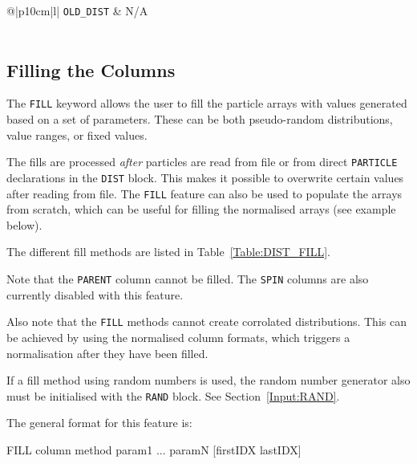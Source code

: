 \begin{center}
\begin{longtable}{@{\extracolsep{\fill}}|p{10cm}|l|}
    \rowcolor{gray!15}
    \texttt{OLD\_DIST} & N/A \\*
    \hline
    \multicolumn{2}{|>{\raggedright}p{\textwidth}|}{%
        Gives the old file format as described in Table~\ref{tab:distReadFileColumns}. That is, it's equivalent to \texttt{ID PARENT SKIP X[M] Y[M] SKIP XP[1000] YP[1000] SKIP ION\_A ION\_Z MASS[GEV] P[GEV] DT}.
    } \\*
    \hline

\end{longtable}
\end{center}

\subsection{Filling the Columns}

The \texttt{FILL} keyword allows the user to fill the particle arrays with values generated based on a set of parameters.
These can be both pseudo-random distributions, value ranges, or fixed values.

The fills are processed \emph{after} particles are read from file or from direct \texttt{PARTICLE} declarations in the \texttt{DIST} block.
This makes it possible to overwrite certain values after reading from file.
The \texttt{FILL} feature can also be used to populate the arrays from scratch, which can be useful for filling the normalised arrays (see example below).

The different fill methods are listed in Table~\ref{Table:DIST_FILL}.

Note that the \texttt{PARENT} column cannot be filled.
The \texttt{SPIN} columns are also currently disabled with this feature.

Also note that the \texttt{FILL} methods cannot create corrolated distributions.
This can be achieved by using the normalised column formats, which triggers a normalisation after they have been filled.

If a fill method using random numbers is used, the random number generator also must be initialised with the \texttt{RAND} block. See Section~\ref{Input:RAND}.

\bigskip
\noindent The general format for this feature is:
\begin{cverbatim}
FILL column method param1 ... paramN [firstIDX lastIDX]
\end{cverbatim}

